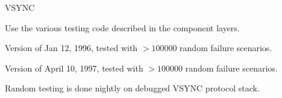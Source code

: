 \begin{Stack}{VSYNC}
\begin{Testing}
\item
Use the various testing code described in the component layers.
\item
Version of Jan 12, 1996, tested with $>100000$ random failure scenarios.
\item
Version of April 10, 1997, tested with $>100000$ random failure scenarios.
\item
Random testing is done nightly on debugged VSYNC protocol stack.
\end{Testing}
\end{Stack}
